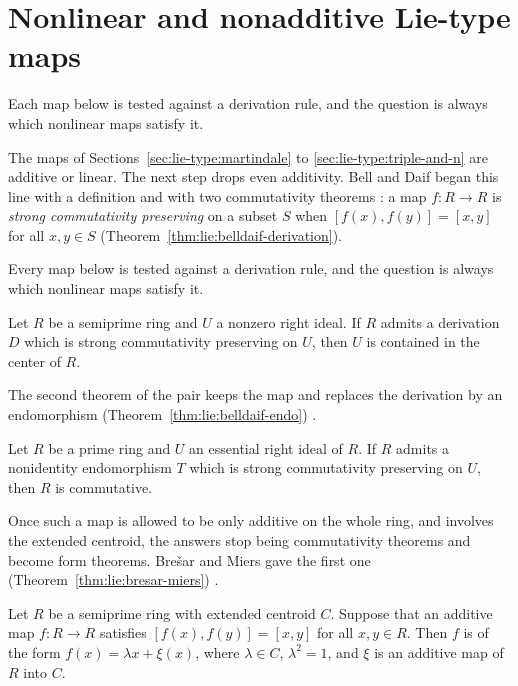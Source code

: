 \section{Nonlinear and nonadditive Lie-type maps}\label{sec:lie-type:nonlinear}

Each map below is tested against a derivation rule, and the question is always which nonlinear maps satisfy it.

The maps of Sections~\ref{sec:lie-type:martindale} to
\ref{sec:lie-type:triple-and-n} are additive or linear. The next step drops
even additivity. %
Bell and Daif began this line with a definition and with two
commutativity theorems \cite[p.~443]{BellDaif1994}: a map $f\colon R\to R$ is
\emph{strong commutativity preserving} on a subset $S$ when
$[f(x),f(y)]=[x,y]$ for all $x,y\in S$ (Theorem~\ref{thm:lie:belldaif-derivation}).

Every map below is tested against a derivation rule, and the question is always which nonlinear maps satisfy it.

\begin{theorem}\label{thm:lie:belldaif-derivation}
Let $R$ be a semiprime ring and $U$ a nonzero right ideal. If $R$ admits a
derivation $D$ which is strong commutativity preserving on $U$, then $U$ is
contained in the center of $R$.
\end{theorem}

The second theorem of the pair keeps the map and replaces the derivation by
an endomorphism (Theorem~\ref{thm:lie:belldaif-endo}) \cite[p.~446]{BellDaif1994}.

\begin{theorem}\label{thm:lie:belldaif-endo}
Let $R$ be a prime ring and $U$ an essential right ideal of $R$. If $R$
admits a nonidentity endomorphism $T$ which is strong commutativity
preserving on $U$, then $R$ is commutative.
\end{theorem}

Once such a map is allowed to be only additive on the whole ring, and
involves the extended centroid, the answers stop being commutativity
theorems and become form theorems. %
Brešar and Miers gave the first one (Theorem~\ref{thm:lie:bresar-miers})
\cite[p.~457]{BresarMiers1994}.\begin{theorem}\label{thm:lie:bresar-miers}
Let $R$ be a semiprime ring with extended centroid $C$. Suppose that an
additive map $f\colon R\to R$ satisfies $[f(x),f(y)]=[x,y]$ for all
$x,y\in R$. Then $f$ is of the form $f(x)=\lambda x+\xi(x)$, where
$\lambda\in C$, $\lambda^{2}=1$, and $\xi$ is an additive map of $R$ into
$C$.
\end{theorem}

